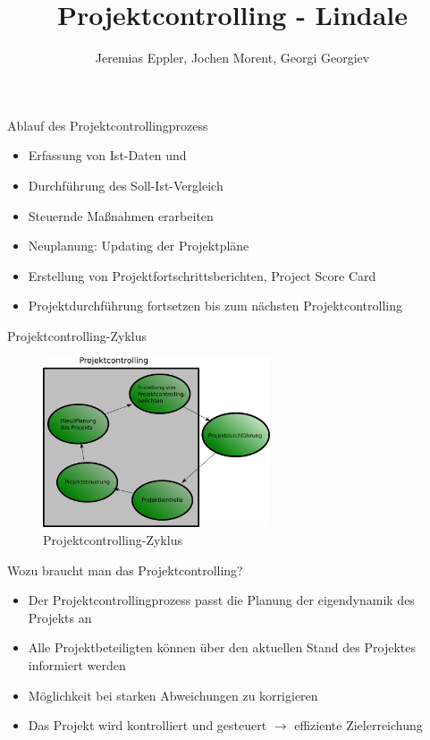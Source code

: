 \documentclass[16pt]{beamer}
\author{Jeremias Eppler, Jochen Morent, Georgi Georgiev}
\title{Projektcontrolling - Lindale }
\begin{document}
\maketitle

\begin{frame}{Ablauf des Projektcontrollingprozess}
\begin{itemize}
  \item Erfassung von Ist-Daten und 
  \item Durchführung des Soll-Ist-Vergleich
  \item Steuernde Maßnahmen erarbeiten
  \item Neuplanung: Updating der Projektpläne
  \item Erstellung von Projektfortschrittsberichten, Project Score Card
  \item Projektdurchführung fortsetzen bis zum nächsten Projektcontrolling
\end{itemize}
\end{frame}

\begin{frame}{Projektcontrolling-Zyklus}
\begin{figure}
\includegraphics[width=0.6\textwidth, height=0.6\textheight, keepaspectratio]{image/projekcontrolling-zyklus}
\caption{Projektcontrolling-Zyklus}
\end{figure}
\end{frame}

\begin{frame}{Wozu braucht man das Projektcontrolling?}
\begin{itemize}
  \item Der Projektcontrollingprozess passt die Planung der eigendynamik des Projekts an
  \item Alle Projektbeteiligten können über den aktuellen Stand des Projektes informiert werden
  \item Möglichkeit bei starken Abweichungen zu korrigieren
  \item Das Projekt wird kontrolliert und gesteuert $\rightarrow$ effiziente Zielerreichung
\end{itemize}
\end{frame}
\end{document}
